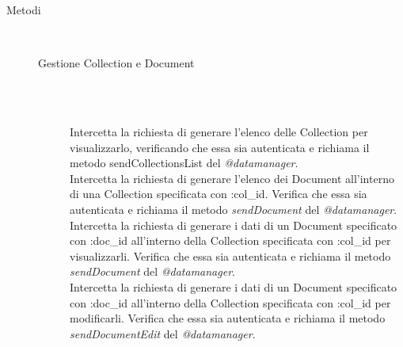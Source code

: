 \begin{description}
 
 
 \item[Metodi] \hfill \\
 \begin{description}
 \item[Gestione Collection e Document] \hfill \\
 \begin{mldescription}
   \hfill \\
  Intercetta la richiesta di generare l'elenco delle Collection per visualizzarlo, verificando che essa sia autenticata e richiama il metodo sendCollectionsList del \textit{@datamanager}.
  \hfill \\   Intercetta la richiesta di generare l'elenco dei Document all'interno di una Collection specificata con :col\_id. Verifica che essa sia autenticata e richiama il metodo \textit{sendDocument} del \textit{@datamanager}.
   \hfill \\
  Intercetta la richiesta di generare i dati di un Document specificato con :doc\_id all'interno della Collection specificata con :col\_id per visualizzarli. Verifica che essa sia autenticata e richiama il metodo \textit{sendDocument} del \textit{@datamanager}.
   \hfill \\
   Intercetta la richiesta di generare i dati di un Document specificato con :doc\_id all'interno della Collection specificata con :col\_id per modificarli. Verifica che essa sia autenticata e richiama il metodo \textit{sendDocumentEdit} del \textit{@datamanager}.
   \hfill \\

\end{mldescription}
\end{description}
\end{description}
